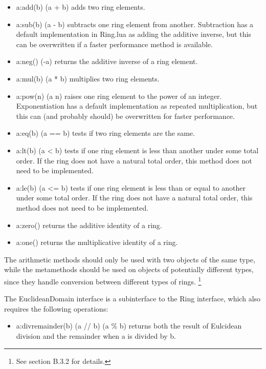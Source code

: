 \documentclass{article}
\begin{document}
\begin{itemize}
    \item {\ttfamily a:add(b) (a + b)} adds two ring elements.
    \item {\ttfamily a:sub(b) (a - b)} subtracts one ring element from another. Subtraction has a default implementation in {\ttfamily Ring.lua} as adding the additive inverse, but this can be overwritten if a faster performance method is available.
    \item {\ttfamily a:neg() (-a)} returns the additive inverse of a ring element.
    \item {\ttfamily a:mul(b) (a * b)} multiplies two ring elements.
    \item {\ttfamily a:pow(n) (a \wedge{} n)} raises one ring element to the power of an integer. Exponentiation has a default implementation as repeated multiplication, but this can (and probably should) be overwritten for faster performance.
    \item {\ttfamily a:eq(b) (a == b)} tests if two ring elements are the same.
    \item {\ttfamily a:lt(b) (a < b)} tests if one ring element is less than another under some total order. If the ring does not have a natural total order, this method does not need to be implemented.
    \item {\ttfamily a:le(b) (a <= b)} tests if one ring element is less than or equal to another under some total order. If the ring does not have a natural total order, this method does not need to be implemented.
    \item {\ttfamily a:zero()} returns the additive identity of a ring.
    \item {\ttfamily a:one()} returns the multiplicative identity of a ring.
\end{itemize}

The arithmetic methods should only be used with two objects of the same type, while the metamethods should be used on objects of potentially different types, since they handle conversion between different types of rings. \footnote{See section B.3.2 for details.}

The {\ttfamily EuclideanDomain} interface is a subinterface to the Ring interface, which also requires the following operations:

\begin{itemize}
    \item {\ttfamily a:divremainder(b) (a // b) (a \% b)} returns both the result of Eulcidean division and the remainder when a is divided by b.
\end{itemize}
\end{document}
